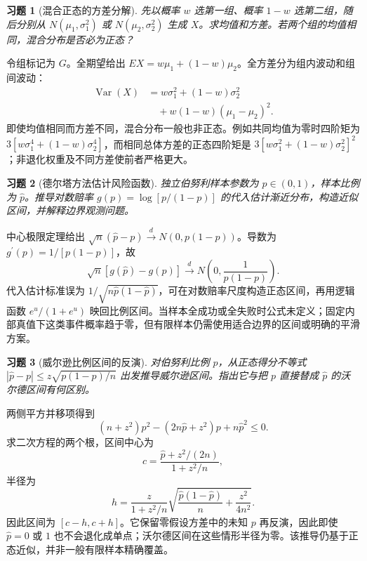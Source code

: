 \documentclass[12pt,fontset=fandol]{ctexart}
\newtheorem{exercise}{习题}[section]
\begin{document}
\begin{exercise}[混合正态的方差分解]\label{q:B17.9}
先以概率 $w$ 选第一组、概率 $1-w$ 选第二组，随后分别从 $N(\mu_1,\sigma_1^2)$ 或 $N(\mu_2,\sigma_2^2)$ 生成 $X$。求均值和方差。若两个组的均值相同，混合分布是否必为正态？\par{}
\end{exercise}

\begin{solve}\label{a:B17.9}令组标记为 $G$。全期望给出 $EX=w\mu_1+(1-w)\mu_2$。全方差分为组内波动和组间波动：\[\begin{aligned}\operatorname{Var}(X)&=w\sigma_1^2+(1-w)\sigma_2^2\\&\quad+w(1-w)(\mu_1-\mu_2)^2.\end{aligned}\]即使均值相同而方差不同，混合分布一般也非正态。例如共同均值为零时四阶矩为 $3[w\sigma_1^4+(1-w)\sigma_2^4]$，而相同总体方差的正态四阶矩是 $3[w\sigma_1^2+(1-w)\sigma_2^2]^2$；非退化权重及不同方差使前者严格更大。\end{solve}

\begin{exercise}[德尔塔方法估计风险函数]\label{q:B17.10}
独立伯努利样本参数为 $p\in(0,1)$，样本比例为 $\widehat p$。推导对数赔率 $g(p)=\log[p/(1-p)]$ 的代入估计渐近分布，构造近似区间，并解释边界观测问题。\par{}
\end{exercise}

\begin{solve}\label{a:B17.10}中心极限定理给出 $\sqrt n(\widehat p-p)\xrightarrow dN(0,p(1-p))$。导数为 $g^{\prime}(p)=1/[p(1-p)]$，故\[\sqrt n[g(\widehat p)-g(p)]\xrightarrow dN\left(0,\frac1{p(1-p)}\right).\]代入估计标准误为 $1/\sqrt{n\widehat p(1-\widehat p)}$，可在对数赔率尺度构造正态区间，再用逻辑函数 $e^u/(1+e^u)$ 映回比例区间。当样本全成功或全失败时公式未定义；固定内部真值下这类事件概率趋于零，但有限样本仍需使用适合边界的区间或明确的平滑方案。\end{solve}

\begin{exercise}[威尔逊比例区间的反演]\label{q:B17.11}
对伯努利比例 $p$，从正态得分不等式 $|\widehat p-p|\le z\sqrt{p(1-p)/n}$ 出发推导威尔逊区间。指出它与把 $p$ 直接替成 $\widehat p$ 的沃尔德区间有何区别。\par{}
\end{exercise}

\begin{solve}\label{a:B17.11}两侧平方并移项得到\[(n+z^2)p^2-(2n\widehat p+z^2)p+n\widehat p^2\le0.\]求二次方程的两个根，区间中心为\[c=\frac{\widehat p+z^2/(2n)}{1+z^2/n},\]半径为\[h=\frac{z}{1+z^2/n}\sqrt{\frac{\widehat p(1-\widehat p)}n+\frac{z^2}{4n^2}}.\]因此区间为 $[c-h,c+h]$。它保留零假设方差中的未知 $p$ 再反演，因此即使 $\widehat p=0$ 或 $1$ 也不会退化成单点；沃尔德区间在这些情形半径为零。该推导仍基于正态近似，并非一般有限样本精确覆盖。\end{solve}
\end{document}
